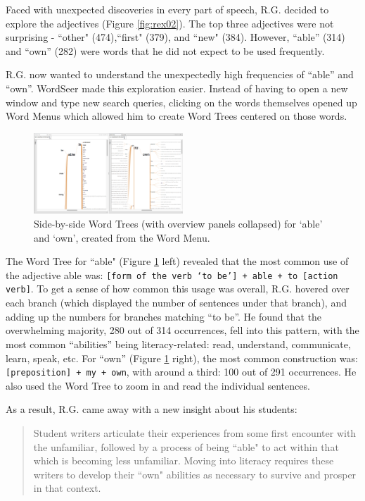 \documentclass{sig-alternate}
\newcommand{\code}[1] {\texttt{#1}}
\begin{document}
Faced with unexpected discoveries in every part of speech, R.G. decided to explore the adjectives (Figure \ref{fig:rex02}). The top three adjectives were not surprising - ``other" (474),``first" (379), and ``new" (384).  However,  ``able'' (314) and ``own'' (282) were words that he did not expect to be used frequently.

R.G. now wanted to understand the unexpectedly high frequencies of ``able'' and ``own''. WordSeer made this exploration easier. Instead of having to open a new window and type new search queries, clicking on the words themselves opened up Word Menus which allowed him to create Word Trees centered on those words.

\begin{figure}[h!]
\includegraphics[width=0.5\textwidth]{fig/rex/04.png}
\caption{ Side-by-side Word Trees (with overview panels collapsed) for `able' and `own', created from the Word Menu. \label{fig:rex04}}
\end{figure}

The Word Tree for ``able" (Figure \ref{fig:rex04} left) revealed that the most common use of the adjective able was: \code{[form of the verb `to be'] + able + to [action verb]}. To get a sense of how common this usage was overall, R.G. hovered over each branch (which displayed the number of sentences under that branch), and adding up the numbers for branches matching ``to be''. He found that the overwhelming majority, 280 out of 314 occurrences, fell into this pattern, with the most common ``abilities'' being literacy-related: read, understand, communicate, learn, speak, etc. For  ``own'' (Figure \ref{fig:rex04} right), the most common construction was: \code{[preposition] + my + own}, with around a third: 100 out of 291 occurrences.  He also used the Word Tree to zoom in and read the individual sentences.

As a result, R.G. came away with a new insight about his students:
\begin{quote}
Student writers articulate their experiences from some first encounter with the unfamiliar, followed by a process of being ``able" to act within that which is becoming less unfamiliar.  Moving into literacy requires these writers to develop their ``own" abilities as necessary to survive and prosper in that context.
\end{quote} 
\end{document}
